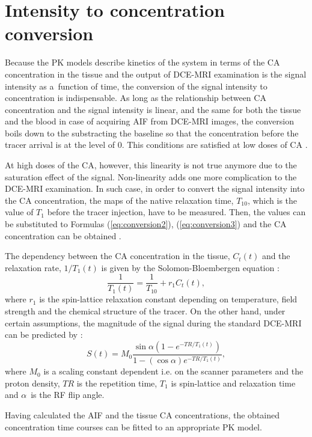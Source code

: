 \section{Intensity to concentration conversion}
Because the PK models describe kinetics of the system in terms of the CA concentration in the tissue and the output of DCE-MRI examination is the signal intensity as a~function of time, the conversion of the signal intensity to concentration is indispensable. 
As long as the relationship between CA concentration and the signal intensity  is linear, and the same for both the tissue and the blood in case of acquiring AIF from DCE-MRI images, the conversion boils down to the substracting the baseline so that the concentration before the tracer arrival is at the level of 0. This conditions are satisfied at low doses of CA \cite{khalifa2014models}.

At high doses of the CA, however, this linearity is not true anymore due to the saturation effect of the signal. Non-linearity adds one more complication to the DCE-MRI examination. In such case, in order to convert the signal intensity into the CA concentration, the maps of the native relaxation time, $T_{10}$, which is the value of $T_1$ before the tracer injection, have to be measured. Then, the values can be substituted to Formulas (\ref{eq:conversion2}), (\ref{eq:conversion3}) and the CA concentration can be obtained \cite{khalifa2014models, jackson2005dynamic, barnes2012practical}.


The dependency between the CA concentration in the tissue, $C_t(t)$  and the relaxation rate, $1/T_1(t)$ is given by the Solomon-Bloembergen equation \cite{jackson2005dynamic}:
 \begin{equation}
 \frac{1}{T_1(t)} = \frac{1}{T_{10}}+r_1C_t(t),
 \label{eq:conversion2}
 \end{equation}
where $r_1$ is the spin-lattice relaxation constant depending on temperature, field strength and the chemical structure of the tracer. On the other hand, under certain assumptions, the magnitude of the signal during the standard DCE-MRI can be predicted by \cite{khalifa2014models, jackson2005dynamic}:
  \begin{equation}
 S(t)  = M_0\frac{\sin\alpha(1-e^{-TR/T_1(t)})}      {1-(\cos\alpha)e^{-TR/T_1(t)}},
 \label{eq:conversion3}
 \end{equation} 
where $M_0$ is a scaling constant dependent i.e. on the scanner parameters and the proton density, $TR$ is the repetition time, $T_1$ is spin-lattice and relaxation time and $\alpha$~is the RF flip angle.

Having calculated the AIF and the tissue CA concentrations, the obtained concentration time courses can be fitted to an appropriate PK model. 
